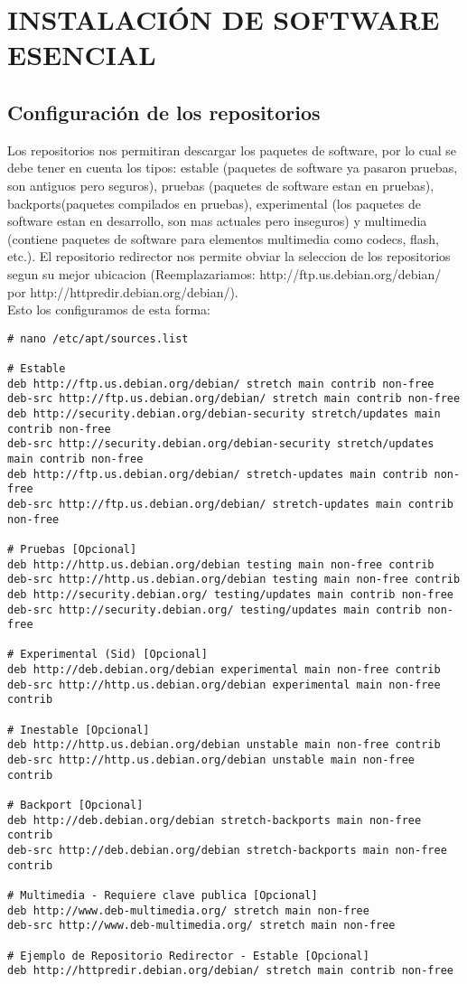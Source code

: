 \chapter{\uppercase{Instalación de software esencial}}\label{chap:ins.sof.ese}

\newpage

\section{Configuración de los repositorios}
Los repositorios nos permitiran descargar los paquetes de software, por lo cual se debe tener en cuenta los tipos: estable (paquetes de software ya pasaron pruebas, son antiguos pero seguros), pruebas (paquetes de software estan en pruebas), backports(paquetes compilados en pruebas), experimental (los paquetes de software estan en desarrollo, son mas actuales pero inseguros) y multimedia (contiene paquetes de software para elementos multimedia como codecs, flash, etc.). El repositorio redirector nos permite obviar la seleccion de los repositorios segun su mejor ubicacion (Reemplazariamos: http://ftp.us.debian.org/debian/ por http://httpredir.debian.org/debian/).\\
Esto los configuramos de esta forma:
\begin{verbatim}
# nano /etc/apt/sources.list

# Estable
deb http://ftp.us.debian.org/debian/ stretch main contrib non-free
deb-src http://ftp.us.debian.org/debian/ stretch main contrib non-free
deb http://security.debian.org/debian-security stretch/updates main contrib non-free
deb-src http://security.debian.org/debian-security stretch/updates main contrib non-free
deb http://ftp.us.debian.org/debian/ stretch-updates main contrib non-free
deb-src http://ftp.us.debian.org/debian/ stretch-updates main contrib non-free
 
# Pruebas [Opcional]
deb http://http.us.debian.org/debian testing main non-free contrib
deb-src http://http.us.debian.org/debian testing main non-free contrib
deb http://security.debian.org/ testing/updates main contrib non-free
deb-src http://security.debian.org/ testing/updates main contrib non-free
 
# Experimental (Sid) [Opcional]
deb http://deb.debian.org/debian experimental main non-free contrib
deb-src http://http.us.debian.org/debian experimental main non-free contrib

# Inestable [Opcional]
deb http://http.us.debian.org/debian unstable main non-free contrib
deb-src http://http.us.debian.org/debian unstable main non-free contrib

# Backport [Opcional]
deb http://deb.debian.org/debian stretch-backports main non-free contrib
deb-src http://deb.debian.org/debian stretch-backports main non-free contrib

# Multimedia - Requiere clave publica [Opcional] 
deb http://www.deb-multimedia.org/ stretch main non-free
deb-src http://www.deb-multimedia.org/ stretch main non-free

# Ejemplo de Repositorio Redirector - Estable [Opcional]
deb http://httpredir.debian.org/debian/ stretch main contrib non-free
\end{verbatim}

